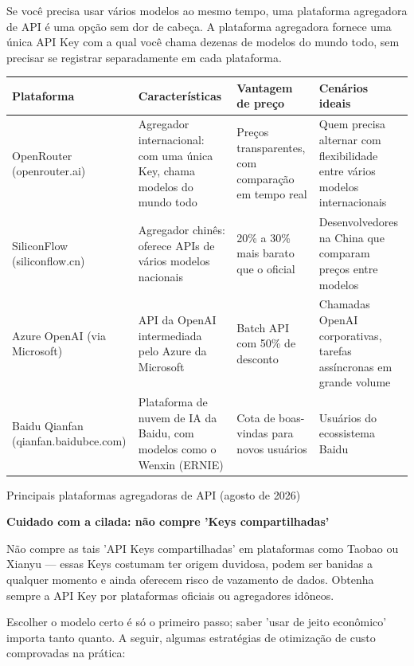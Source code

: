 
Se você precisa usar vários modelos ao mesmo tempo, uma plataforma agregadora de API é uma opção sem dor de cabeça. A plataforma agregadora fornece uma única API Key com a qual você chama dezenas de modelos do mundo todo, sem precisar se registrar separadamente em cada plataforma.

\begin{center}
\begin{tabularx}{\linewidth}{|X|X|X|X|}
\hline
\textbf{Plataforma} & \textbf{Características} & \textbf{Vantagem de preço} & \textbf{Cenários ideais} \tabularnewline
\hline
OpenRouter (openrouter.ai) & Agregador internacional: com uma única Key, chama modelos do mundo todo & Preços transparentes, com comparação em tempo real & Quem precisa alternar com flexibilidade entre vários modelos internacionais \tabularnewline
SiliconFlow (siliconflow.cn) & Agregador chinês: oferece APIs de vários modelos nacionais & 20\% a 30\% mais barato que o oficial & Desenvolvedores na China que comparam preços entre modelos \tabularnewline
Azure OpenAI (via Microsoft) & API da OpenAI intermediada pelo Azure da Microsoft & Batch API com 50\% de desconto & Chamadas OpenAI corporativas, tarefas assíncronas em grande volume \tabularnewline
Baidu Qianfan (qianfan.baidubce.com) & Plataforma de nuvem de IA da Baidu, com modelos como o Wenxin (ERNIE) & Cota de boas-vindas para novos usuários & Usuários do ecossistema Baidu \tabularnewline
\hline
\end{tabularx}
\end{center}

\begin{center}\small\color{gray}Principais plataformas agregadoras de API (agosto de 2026)\end{center}

\textbf{Cuidado com a cilada: não compre 'Keys compartilhadas'}\par

Não compre as tais 'API Keys compartilhadas' em plataformas como Taobao ou Xianyu — essas Keys costumam ter origem duvidosa, podem ser banidas a qualquer momento e ainda oferecem risco de vazamento de dados. Obtenha sempre a API Key por plataformas oficiais ou agregadores idôneos.


Escolher o modelo certo é só o primeiro passo; saber 'usar de jeito econômico' importa tanto quanto. A seguir, algumas estratégias de otimização de custo comprovadas na prática:

